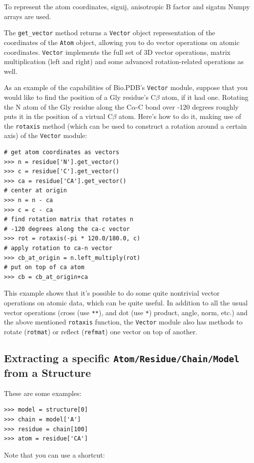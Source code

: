 \documentclass{report}
\begin{document}
To represent the atom coordinates, siguij, anisotropic B factor and sigatm Numpy
arrays are used.

The \texttt{get\_vector} method returns a \texttt{Vector} object representation of the coordinates of the \texttt{Atom} object, allowing you to do vector operations on atomic coordinates. \texttt{Vector} implements the full set of 3D vector operations, matrix multiplication (left and right) and some advanced rotation-related operations as well.

As an example of the capabilities of Bio.PDB's \texttt{Vector} module,
suppose that you would like to find the position of a Gly residue's C$\beta$
atom, if it had one. Rotating the N atom of
the Gly residue along the C$\alpha$-C bond over -120 degrees roughly
puts it in the position of a virtual C$\beta$ atom. Here's how to
do it, making use of the \texttt{rotaxis} method (which can be used
to construct a rotation around a certain axis) of the \texttt{Vector}
module:

\begin{verbatim}
# get atom coordinates as vectors
>>> n = residue['N'].get_vector() 
>>> c = residue['C'].get_vector() 
>>> ca = residue['CA'].get_vector()
# center at origin
>>> n = n - ca 
>>> c = c - ca 
# find rotation matrix that rotates n 
# -120 degrees along the ca-c vector
>>> rot = rotaxis(-pi * 120.0/180.0, c)
# apply rotation to ca-n vector
>>> cb_at_origin = n.left_multiply(rot)
# put on top of ca atom
>>> cb = cb_at_origin+ca
\end{verbatim}
This example shows that it's possible to do some quite nontrivial
vector operations on atomic data, which can be quite useful. In addition
to all the usual vector operations (cross (use \texttt{{*}{*}}), and
dot (use \texttt{{*}}) product, angle, norm, etc.) and the above mentioned
\texttt{rotaxis} function, the \texttt{Vector} module also has methods
to rotate (\texttt{rotmat}) or reflect (\texttt{refmat}) one vector
on top of another.

\subsection{Extracting a specific \texttt{Atom/\-Residue/\-Chain/\-Model}
from a Structure}

These are some examples:

\begin{verbatim}
>>> model = structure[0]
>>> chain = model['A']
>>> residue = chain[100]
>>> atom = residue['CA']
\end{verbatim}
Note that you can use a shortcut:
\end{document}
